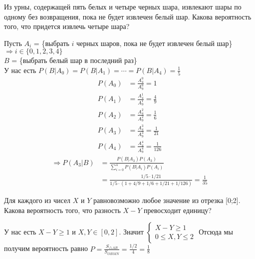 \begin{exercise}[2] Из урны, содержащей пять белых и четыре черных шара, извлекают шары по одному без возвращения, пока не будет извлечен белый шар. Какова вероятность того, что придется извлечь четыре шара?
	
	Пусть $A_i$ = \{выбрать $i$ черных шаров, пока не будет извлечен белый шар\} $\Rightarrow i \in \{0, 1, 2, 3, 4\}$ \\ $B$ = \{выбрать белый шар в последний раз\} \\ У нас есть $P(B|A_0) = P(B|A_1) = \cdots = P(B|A_4) = \frac{1}{5}$
	\begin{align*}
		P(A_0) & = \frac{A^0_4}{A^0_9} = 1 \\ P(A_1) & = \frac{A^1_4}{A^1_9} = \frac{4}{9} \\ P(A_2) & = \frac{A^2_4}{A^2_9} = \frac{1}{6} \\ P(A_3) & = \frac{A^3_4}{A^3_9} = \frac{1}{21} \\ P(A_4) & = \frac{A^4_4}{A^4_9} = \frac{1}{126}
	\end{align*}
	\begin{align*}
		\Rightarrow P(A_3 | B) & = \frac{P(B|A_3)P(A_3)}{\sum_{i=0}^{4}P(B|A_i) P(A_i)} \\ & = \frac{1/5 \cdot 1/21}{1/5 \cdot (1 + 4/9 + 1/6 + 1/21 + 1/126)} = \frac{1}{35}
	\end{align*}
\end{exercise}

\begin{exercise}[3] Для каждого из чисел $X$ и $Y$ равновозможно любое значение из отрезка [0;2]. Какова вероятность того, что разность $X - Y$ превосходит единицу?
	
	У нас есть $X-Y \geq 1$ и $X, Y \in [0,2]$. Значит
	$\begin{cases}
		X - Y \geq 1 \\ 0 \leq X, Y \leq 2
	\end{cases}$
	Отсюда мы получим вероятность равно $P = \frac{S_{\triangle AB}}{S_{OBMN}} = \frac{1/2}{4} = \frac{1}{8}$
\end{exercise}

